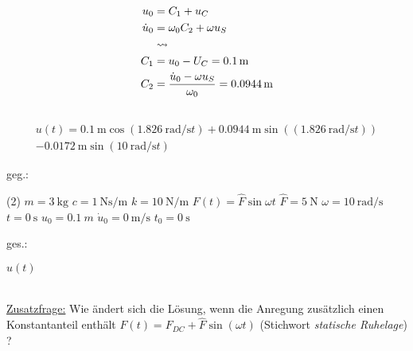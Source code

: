 \documentclass[12pt]{exam}
\begin{document}
\begin{questions}
\begin{solution}
    \begin{align*}
        u_0 &= C_1 + u_C \\
        \dot{u}_0 &= \omega_0 C_2+\omega u_S\\
        &\rightsquigarrow \\
        C_1 &=  u_0 - U_C = \SI{0.1}{\meter}\\
        C_2 &= \frac{\dot{u}_0 - \omega u_S}{\omega_0} = \SI{0.0944}{\meter} \\
        \vspace{1cm}
        \end{align*}
        \begin{equation*}
            \begin{split}
        u(t) = \SI{0.1}{\meter} \cos{(\SI{1.826}{\radian\per\second} t)} +\SI{0.0944}{\meter} \sin{((\SI{1.826}{\radian\per\second} t))} \\ - \SI{0.0172}{\meter}\sin{(\SI{10}{\radian\per\second} t)}
        \end{split}
        \end{equation*}
    \end{solution}
 
 

     \begin{minipage}[t]{.49\linewidth}
        geg.:
        \begin{tasks}(2)
           \task[] $m = \SI{3}{\kilo\gram}$
           \task[] $c = \SI{1}{\newton\second\per\meter}$
           \task[] $k = \SI{10}{\newton\per\meter}$
            \task[] $F(t) = \hat{F} \sin{\omega t}$
           \task[] $\hat{F} = \SI{5}{\newton}$
           \task[] $\omega = \SI{10}{\radian\per\second}$
           \task[] $t=\SI{0}{\second}$
           \task[] $u_0 = \SI{0.1}{m}$
           \task[] $\dot{u}_0 = \SI{0}{\meter\per\second}$
           \task[] $t_0 = \SI{0}{\second}$
        \end{tasks}
        \end{minipage}
        \begin{minipage}[t]{.49\linewidth}
        ges.:
        \begin{tasks}
            \task $u(t)$
        \end{tasks}
        \end{minipage}\\
        \vspace{1cm}
        \underline{Zusatzfrage:} Wie ändert sich die Lösung, wenn die Anregung zusätzlich einen Konstantanteil enthält $F(t) = F_{DC} +\hat{F} \sin{(\omega t)}$ (Stichwort \textit{statische Ruhelage}) ?
        

\end{questions}
\end{document}
